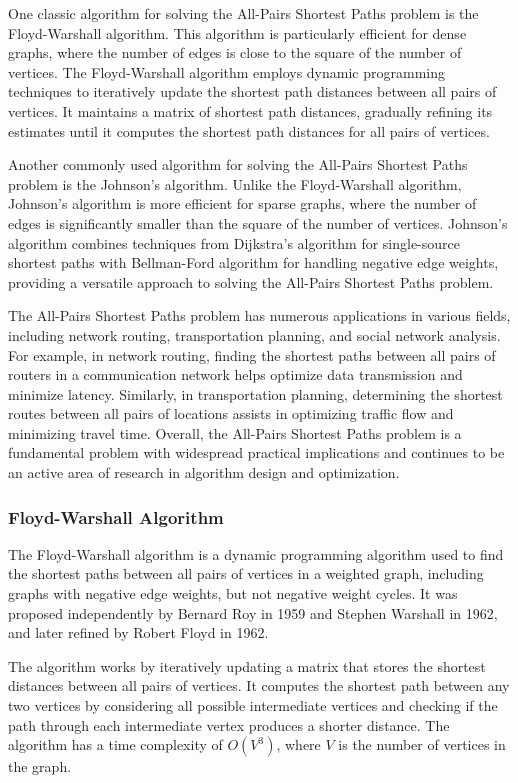\documentclass[12pt]{book} %
\begin{document}
One classic algorithm for solving the All-Pairs Shortest Paths problem is the Floyd-Warshall algorithm. This algorithm is particularly efficient for dense graphs, where the number of edges is close to the square of the number of vertices. The Floyd-Warshall algorithm employs dynamic programming techniques to iteratively update the shortest path distances between all pairs of vertices. It maintains a matrix of shortest path distances, gradually refining its estimates until it computes the shortest path distances for all pairs of vertices.

Another commonly used algorithm for solving the All-Pairs Shortest Paths problem is the Johnson's algorithm. Unlike the Floyd-Warshall algorithm, Johnson's algorithm is more efficient for sparse graphs, where the number of edges is significantly smaller than the square of the number of vertices. Johnson's algorithm combines techniques from Dijkstra's algorithm for single-source shortest paths with Bellman-Ford algorithm for handling negative edge weights, providing a versatile approach to solving the All-Pairs Shortest Paths problem.

The All-Pairs Shortest Paths problem has numerous applications in various fields, including network routing, transportation planning, and social network analysis. For example, in network routing, finding the shortest paths between all pairs of routers in a communication network helps optimize data transmission and minimize latency. Similarly, in transportation planning, determining the shortest routes between all pairs of locations assists in optimizing traffic flow and minimizing travel time. Overall, the All-Pairs Shortest Paths problem is a fundamental problem with widespread practical implications and continues to be an active area of research in algorithm design and optimization.
\subsubsection{Floyd-Warshall Algorithm}
The Floyd-Warshall algorithm is a dynamic programming algorithm used to find the shortest paths between all pairs of vertices in a weighted graph, including graphs with negative edge weights, but not negative weight cycles. It was proposed independently by Bernard Roy in 1959 and Stephen Warshall in 1962, and later refined by Robert Floyd in 1962.

The algorithm works by iteratively updating a matrix that stores the shortest distances between all pairs of vertices. It computes the shortest path between any two vertices by considering all possible intermediate vertices and checking if the path through each intermediate vertex produces a shorter distance. The algorithm has a time complexity of $O(V^3)$, where $V$ is the number of vertices in the graph.
\end{document}
